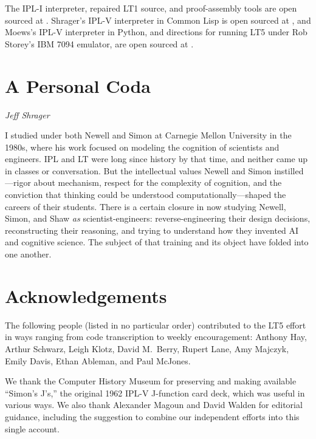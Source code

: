 \documentclass[journal]{IEEEtran}
\begin{document}
The IPL-I interpreter, repaired LT1 source, and proof-assembly tools
are open sourced at \cite{moewsrepo}.
Shrager's IPL-V interpreter in Common Lisp is open sourced at
\cite{shragerrepo}, and Moews's IPL-V interpreter
in Python, and directions for running LT5 under Rob Storey's IBM 7094
emulator, are open sourced at \cite{moewsrepo2}.

\section*{A Personal Coda}

%
%

{\em Jeff Shrager}

I studied under both Newell and Simon at Carnegie
Mellon University in the 1980s, where his work focused on modeling the
cognition of scientists and engineers. IPL and LT were long since
history by that time, and neither came up in classes or
conversation. But the intellectual values Newell and Simon
instilled---rigor about mechanism, respect for the complexity of
cognition, and the conviction that thinking could be understood
computationally---shaped the careers of their students. There is a
certain closure in now studying Newell, Simon, and Shaw \textit{as}
scientist-engineers: reverse-engineering their design decisions,
reconstructing their reasoning, and trying to understand how they
invented AI and cognitive science. The subject of that training and
its object have folded into one another.

\section*{Acknowledgements}


The following people (listed in no particular order) contributed to
the LT5 effort in ways ranging from code transcription to weekly
encouragement: Anthony Hay, Arthur Schwarz, Leigh Klotz, David
M.\ Berry, Rupert Lane, Amy Majczyk, Emily Davis, Ethan Ableman, and
Paul McJones. 

We thank the Computer History Museum for preserving and making
available ``Simon's J's,'' the original 1962 IPL-V J-function card
deck, which was useful in various ways. We also thank Alexander
Magoun and David Walden for editorial guidance, including the
suggestion to combine our independent efforts into this single
account.
\end{document}
